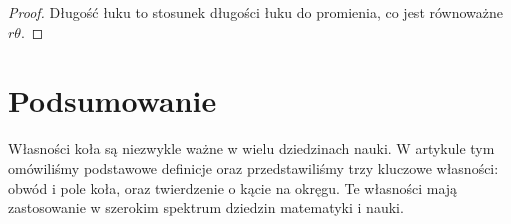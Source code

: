 \documentclass[12pt]{article}
\begin{document}
\begin{proof}
Długość łuku to stosunek długości łuku do promienia, co jest równoważne $r\theta$.
\end{proof}

\section{Podsumowanie}
Własności koła są niezwykle ważne w wielu dziedzinach nauki. W artykule tym omówiliśmy podstawowe definicje oraz przedstawiliśmy trzy kluczowe własności: obwód i pole koła, oraz twierdzenie o kącie na okręgu. Te własności mają zastosowanie w szerokim spektrum dziedzin matematyki i nauki.
\end{document}
